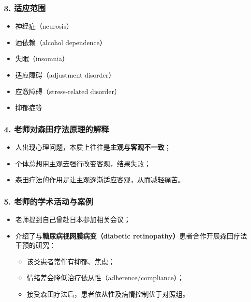 \documentclass[
  chinese,
  9pt,
  a4paper,
]{ctexart}
\providecommand{\tightlist}{%
  \setlength{\itemsep}{0pt}\setlength{\parskip}{0pt}}
\begin{document}
\subsubsection{3. 适应范围}\label{ux9002ux5e94ux8303ux56f4}

\begin{itemize}
\tightlist
\item
  神经症（neurosis）
\item
  酒依赖（alcohol dependence）
\item
  失眠（insomnia）
\item
  适应障碍（adjustment disorder）
\item
  应激障碍（stress-related disorder）
\item
  抑郁症等
\end{itemize}

\subsubsection{4.
老师对森田疗法原理的解释}\label{ux8001ux5e08ux5bf9ux68eeux7530ux7597ux6cd5ux539fux7406ux7684ux89e3ux91ca}

\begin{itemize}
\tightlist
\item
  人出现心理问题，本质上往往是\textbf{主观与客观不一致}；
\item
  个体总想用主观去强行改变客观，结果失败；
\item
  森田疗法的作用是让主观逐渐适应客观，从而减轻痛苦。
\end{itemize}

\subsubsection{5.
老师的学术活动与案例}\label{ux8001ux5e08ux7684ux5b66ux672fux6d3bux52a8ux4e0eux6848ux4f8b}

\begin{itemize}
\item
  老师提到自己曾赴日本参加相关会议；
\item
  介绍了与\textbf{糖尿病视网膜病变（diabetic
  retinopathy）}患者合作开展森田疗法干预的研究：

  \begin{itemize}
  \tightlist
  \item
    该类患者常伴有抑郁、焦虑；
  \item
    情绪差会降低治疗依从性（adherence/compliance）；
  \item
    接受森田疗法后，患者依从性及病情控制优于对照组。
  \end{itemize}
\end{itemize}
\end{document}
